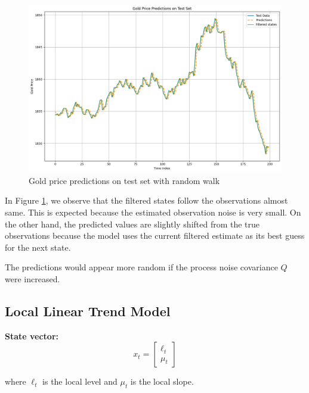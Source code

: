 
\begin{figure}[H]
    \centering
    \includegraphics[width=0.5\linewidth]{Figures/Gold Price Predictions Random Walk.png}
    \caption{Gold price predictions on test set with random walk}
    \label{fig:randwal}
\end{figure}

In Figure \ref{fig:randwal}, we observe that the filtered states follow the observations almost same. This is expected because the estimated observation noise is very small. On the other hand, the predicted values are slightly shifted from the true observations because the model uses the current filtered estimate as its best guess for the next state. 

The predictions would appear more random if the process noise covariance $Q$ were increased. 




\newpage
\subsection*{Local Linear Trend Model}

\medskip
\noindent 
\textbf{State vector:}
\[x_t= \begin{bmatrix} 
                \ell_t \\ 
                \mu_t 
            \end{bmatrix}\]

where $\ell_t$ is the local level and $\mu_t$ is the local slope.

